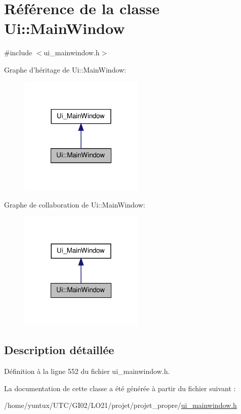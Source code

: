 \hypertarget{class_ui_1_1_main_window}{\section{\-Référence de la classe \-Ui\-:\-:\-Main\-Window}
\label{class_ui_1_1_main_window}
}


{\ttfamily \#include $<$ui\-\_\-mainwindow.\-h$>$}



\-Graphe d'héritage de \-Ui\-:\-:\-Main\-Window\-:\nopagebreak
\begin{figure}[H]
\begin{center}
\leavevmode
\includegraphics[width=168pt]{class_ui_1_1_main_window__inherit__graph}
\end{center}
\end{figure}


\-Graphe de collaboration de \-Ui\-:\-:\-Main\-Window\-:\nopagebreak
\begin{figure}[H]
\begin{center}
\leavevmode
\includegraphics[width=168pt]{class_ui_1_1_main_window__coll__graph}
\end{center}
\end{figure}


\subsection{\-Description détaillée}


\-Définition à la ligne 552 du fichier ui\-\_\-mainwindow.\-h.



\-La documentation de cette classe a été générée à partir du fichier suivant \-:\begin{DoxyCompactItemize}
\item 
/home/yuntux/\-U\-T\-C/\-G\-I02/\-L\-O21/projet/projet\-\_\-propre/\hyperlink{ui__mainwindow_8h}{ui\-\_\-mainwindow.\-h}\end{DoxyCompactItemize}

